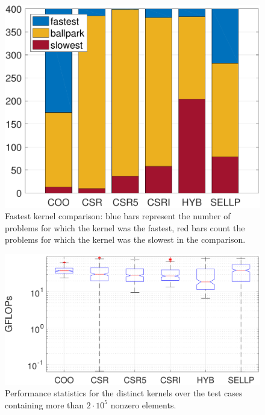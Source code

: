 \begin{figure}
\begin{center}
\includegraphics[width=\columnwidth]{plots/stats0}
\end{center}
\caption{Fastest kernel comparison: blue bars represent the number of problems
    for which the kernel was the fastest, red bars count the problems for which
    the kernel was the slowest in the comparison.}
\label{fig:stats}
\end{figure}

\begin{figure}
\begin{center}
\includegraphics[width=\columnwidth]{plots/boxplot_log_csri_2e5}
\end{center}
\caption{Performance statistics for the distinct kernels over the test cases containing more than $2\cdot 10^5$ nonzero elements.}
\label{fig:boxplot}
\end{figure}

